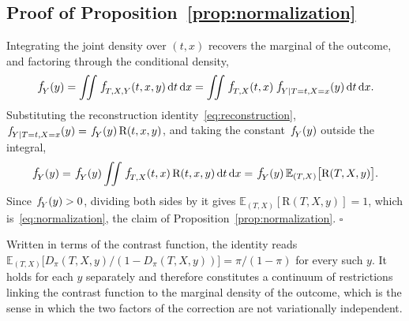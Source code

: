 \documentclass[11pt]{article}
\theoremstyle{plain}
\theoremstyle{definition}
\theoremstyle{remark}
\newcommand{\pE}{\ensuremath{\mathbb{E}}}
\newcommand{\pf}[1]{\ensuremath{\,\mathlarger{\textit{f}}_{#1}}}
\newcommand{\ratio}{\ensuremath{\pi}}
\newcommand{\contrast}{D_{\ratio}}
\newcommand{\DensityRatio}{\text{R}}
\newcommand{\dd}{\,\mathrm{d}}
\begin{document}
\subsection{Proof of Proposition~\ref{prop:normalization}}
\label{app:asymptotics-normalization}

Integrating the joint density over $(t,x)$ recovers the marginal of the outcome, and factoring
through the conditional density,
\[
\pf{Y}(y)
= \iint \pf{T,X,Y}(t,x,y) \dd t \dd x
= \iint \pf{T,X}(t,x)\,\pf{Y \mid T=t,X=x}(y) \dd t \dd x .
\]
Substituting the reconstruction identity~\eqref{eq:reconstruction},
$\pf{Y \mid T=t,X=x}(y) = \pf{Y}(y)\,\DensityRatio(t,x,y)$, and taking the constant $\pf{Y}(y)$
outside the integral,
\[
\pf{Y}(y)
= \pf{Y}(y) \iint \pf{T,X}(t,x)\,\DensityRatio(t,x,y) \dd t \dd x
= \pf{Y}(y)\,\pE_{(T,X)}\big[ \DensityRatio(T,X,y) \big].
\]
Since $\pf{Y}(y) > 0$, dividing both sides by it gives
$\pE_{(T,X)}[\DensityRatio(T,X,y)] = 1$, which is~\eqref{eq:normalization}, the claim of
Proposition~\ref{prop:normalization}. \hfill$\square$

Written in terms of the contrast function, the identity reads
$\pE_{(T,X)}\big[\contrast(T,X,y)/(1-\contrast(T,X,y))\big] = \ratio/(1-\ratio)$ for every such
$y$. It holds for each $y$ separately and therefore constitutes a continuum of restrictions
linking the contrast function to the marginal density of the outcome, which is the sense in
which the two factors of the correction are not variationally independent.
\end{document}
